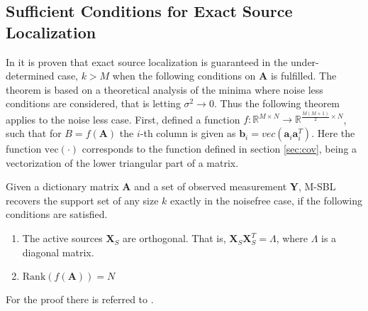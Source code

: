\subsection{Sufficient Conditions for Exact Source Localization}
In \cite{Balkan2014} it is proven that exact source localization is guaranteed in the under-determined case, $k>M$ when the following conditions on $\textbf{A}$ is fulfilled.
The theorem is based on a theoretical analysis of the minima where noise less conditions are considered, that is letting $\sigma^2\rightarrow 0$. Thus the following theorem applies to the noise less case.   
First, defined a function $f:\mathbb{R}^{M\times N} \rightarrow \mathbb{R}^{\frac{M(M+1)}{2}\times N}$, such that for $B = f(\textbf{A})$ the $i$-th column is given as $\textbf{b}_i = vec(\textbf{a}_i\textbf{a}_i^T)$. Here the function $\text{vec}(\cdot)$ corresponds to the function defined in section \ref{sec:cov}, being a vectorization of the lower triangular part of a matrix.	
\begin{theorem}
Given a dictionary matrix $\textbf{A}$ and a set of observed measurement $\textbf{Y}$, M-SBL recovers the support set of any size $k$ exactly in the noisefree case, if the following conditions are satisfied. 
\begin{enumerate}
\item The active sources $\textbf{X}_S$ are orthogonal. That is, $\textbf{X}_S\textbf{X}_S^T = \Lambda$, where $\Lambda$ is a diagonal matrix.
\item $\text{Rank}(f(\textbf{A}))= N$
\end{enumerate}
For the proof there is referred to \cite[p. 16]{Balkan2014}.



\end{theorem}  

